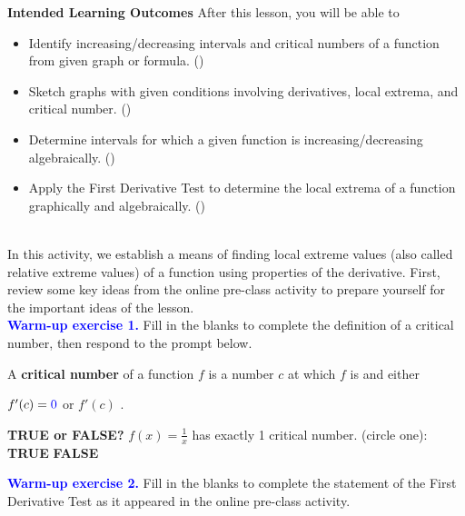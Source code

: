 \documentclass[10pt]{article}
\begin{document}
\pagestyle{otherpages}
\thispagestyle{firstpage}

\textbf{Intended Learning Outcomes}
After this lesson, you will be able to 

\begin{itemize}
    \item Identify increasing/decreasing intervals and critical numbers of a function from given graph or formula. ()
    \item Sketch graphs with given conditions involving derivatives, local extrema, and critical number. ()
    \item Determine intervals for which a given function is increasing/decreasing algebraically. ()
    \item Apply the First Derivative Test to determine the local extrema of a function graphically and algebraically. ()
\end{itemize}

\vspace{-0.5cm}

\hrulefill\\

In this activity, we establish a means of finding local extreme values (also called relative extreme values) of a function using properties of the derivative. First, review some key ideas from the online pre-class activity to prepare yourself for the important ideas of the lesson.\\

{\bf \textcolor{blue}{Warm-up exercise 1.}}  Fill in the blanks to complete the definition of a critical number, then respond to the prompt below.
%
    {
    A {\bf critical number} of a function $f$ is a number $c$ at which $f$ is  and either
    \begin{center}
    $f'(c) = {\color{blue}0}$ \quad\quad\quad or \quad\quad\quad $f'(c)$ .
    \end{center}
    }
    
    {\bf TRUE or FALSE?} $\displaystyle f(x)=\frac1x$ has exactly 1 critical number. \hfill (circle one): \hfill {\bf TRUE} \hfill {\bf FALSE}


{\bf \textcolor{blue}{Warm-up exercise 2.}} Fill in the blanks to complete the statement of the First Derivative Test as it appeared in the online pre-class activity.
\end{document}
